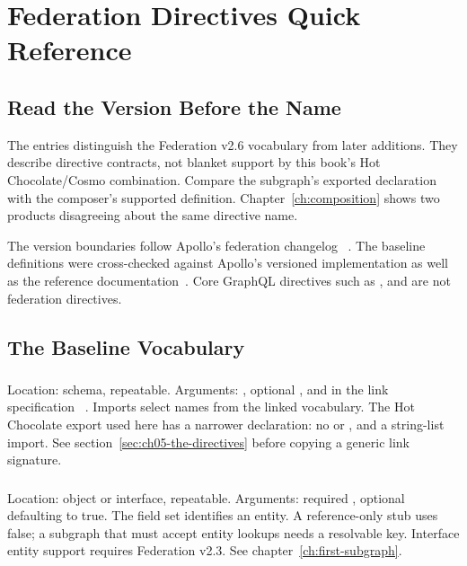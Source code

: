 \chapter{Federation Directives Quick Reference}
\label{app:directives}

\section{Read the Version Before the Name}

The entries distinguish the Federation v2.6 vocabulary from later additions.
They describe directive contracts, not blanket support by this book's
Hot Chocolate/Cosmo combination. Compare the subgraph's exported declaration
with the composer's supported definition. Chapter~\ref{ch:composition} shows
two products disagreeing about the same directive name.

The version boundaries follow Apollo's federation changelog
~\autocite{apollofederationversionsrepair}. The baseline definitions were
cross-checked against Apollo's versioned implementation as well as the
reference documentation~\autocite{apollofederation26repair}. Core GraphQL
directives such as ,  and 
are not federation directives.

\section{The Baseline Vocabulary}

\subsection*{}

Location: schema, repeatable. Arguments: , optional ,
 and  in the link specification
~\autocite{apollolinkrepair}. Imports select names from the linked vocabulary.
The Hot Chocolate export used here has a narrower declaration: no
 or , and a string-list import. See
section~\ref{sec:ch05-the-directives} before copying a generic link signature.

\subsection*{}

Location: object or interface, repeatable. Arguments: required
, optional  defaulting to true.
The field set identifies an entity. A reference-only stub uses false; a
subgraph that must accept entity lookups needs a resolvable key. Interface
entity support requires Federation v2.3. See chapter~\ref{ch:first-subgraph}.

